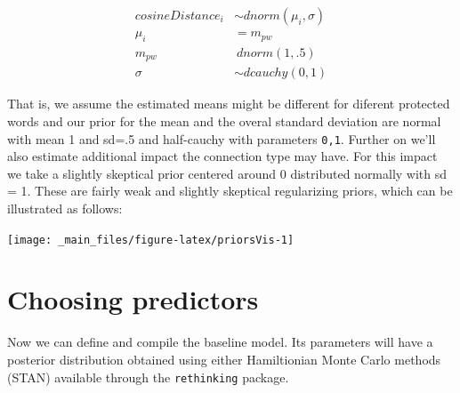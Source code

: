 \documentclass[
  12pt,
]{book}
\begin{document}
\begin{align}
cosineDistance_i  & \sim dnorm(\mu_i, \sigma) \\
\mu_i & = m_{pw} \\
m_{pw} & ~ dnorm(1,.5) \\
\sigma &\sim  dcauchy(0,1)
\end{align}

That is, we assume the estimated means might be different for diferent protected words and our prior for the mean and the overal standard deviation are normal with mean 1 and sd=.5 and half-cauchy with parameters \texttt{0,1}. Further on we'll also estimate additional impact the connection type may have. For this impact we take a slightly skeptical prior centered around 0 distributed normally with sd = 1. These are fairly weak and slightly skeptical regularizing priors, which can be illustrated as follows:

\vspace{2mm}

\begin{center}\texttt{[image: \_main\_files/figure-latex/priorsVis-1]} \end{center}

\hypertarget{choosing-predictors}{%
\section{Choosing predictors}\label{choosing-predictors}}

Now we can define and compile the baseline model. Its parameters will have a posterior distribution obtained using either Hamiltionian Monte Carlo methods (STAN) available through the \texttt{rethinking} package.

\vspace{1mm}
\footnotesize
\end{document}
